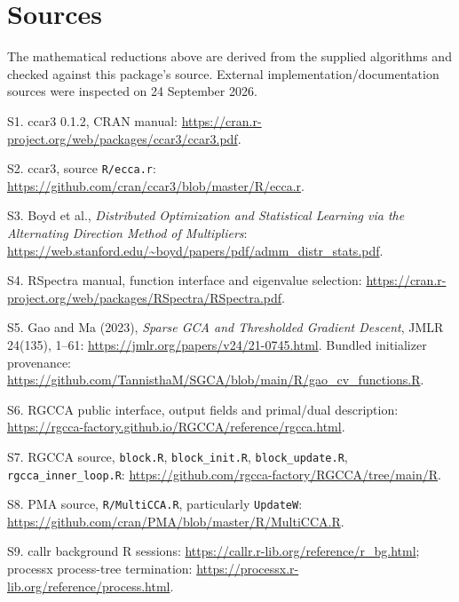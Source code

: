 \documentclass[
  11pt,
]{article}
\begin{document}
\hypertarget{sources}{%
\section{Sources}\label{sources}}

The mathematical reductions above are derived from the supplied
algorithms and checked against this package's source. External
implementation/documentation sources were inspected on 24 September
2026.

S1. ccar3 0.1.2, CRAN manual:
\url{https://cran.r-project.org/web/packages/ccar3/ccar3.pdf}.

S2. ccar3, source \texttt{R/ecca.r}:
\url{https://github.com/cran/ccar3/blob/master/R/ecca.r}.

S3. Boyd et al., \emph{Distributed Optimization and Statistical Learning
via the Alternating Direction Method of Multipliers}:
\url{https://web.stanford.edu/~boyd/papers/pdf/admm_distr_stats.pdf}.

S4. RSpectra manual, function interface and eigenvalue selection:
\url{https://cran.r-project.org/web/packages/RSpectra/RSpectra.pdf}.

S5. Gao and Ma (2023), \emph{Sparse GCA and Thresholded Gradient
Descent}, JMLR 24(135), 1--61:
\url{https://jmlr.org/papers/v24/21-0745.html}. Bundled initializer
provenance:
\url{https://github.com/TannisthaM/SGCA/blob/main/R/gao_cv_functions.R}.

S6. RGCCA public interface, output fields and primal/dual description:
\url{https://rgcca-factory.github.io/RGCCA/reference/rgcca.html}.

S7. RGCCA source, \texttt{block.R}, \texttt{block\_init.R},
\texttt{block\_update.R}, \texttt{rgcca\_inner\_loop.R}:
\url{https://github.com/rgcca-factory/RGCCA/tree/main/R}.

S8. PMA source, \texttt{R/MultiCCA.R}, particularly \texttt{UpdateW}:
\url{https://github.com/cran/PMA/blob/master/R/MultiCCA.R}.

S9. callr background R sessions:
\url{https://callr.r-lib.org/reference/r_bg.html}; processx process-tree
termination: \url{https://processx.r-lib.org/reference/process.html}.
\end{document}
